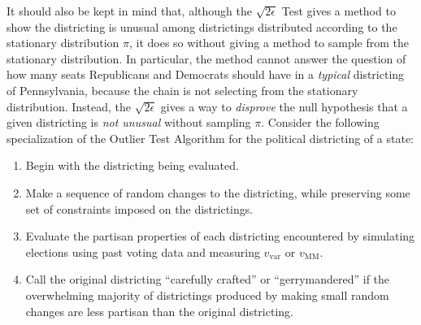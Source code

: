 \documentclass[12pt]{article}
\begin{document}
It should also be kept in mind that, although the \( \sqrt{2\epsilon} \)
Test gives a method to show the districting is unusual among
districtings distributed according to the stationary distribution \( \pi
\), it does so without giving a method to sample from the stationary
distribution.  In particular, the method cannot answer the question of
how many seats Republicans and Democrats should have in a \emph{typical}
districting of Pennsylvania, because the chain is not selecting from the
stationary distribution.  Instead, the \( \sqrt{2\epsilon} \) gives a
way to \emph{disprove} the null hypothesis that a given districting is
\emph{not unusual} without sampling \( \pi \).  Consider the following
specialization of the  Outlier Test Algorithm for the political
districting of a state:\\
\begin{enumerate}
    \item
        Begin with the districting being evaluated.
    \item
        \label{enum:serialsignificance:mcstep} Make a sequence of random
        changes to the districting, while preserving some set of
        constraints imposed on the districtings.
    \item
        Evaluate the partisan properties of each districting encountered
        by simulating elections using past voting data and measuring \(
        v_{\text {var}} \) or \( v_{\text{MM}} \).
    \item
        \label{enum:serialsignificance:crafted} Call the original
        districting ``carefully crafted'' or ``gerrymandered'' if the
        overwhelming majority of districtings produced by making small
        random changes are less partisan than the original districting.
\end{enumerate}
\end{document}
